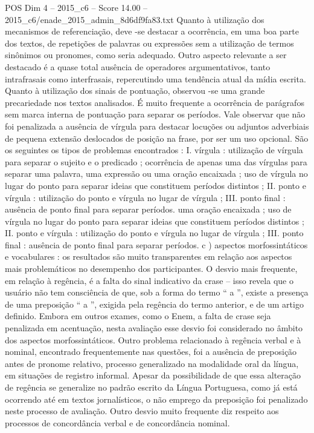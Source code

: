 \begin{textsample}{POS Dim 4 – 2015\_c6 – Score 14.00 – 2015\_c6/enade\_2015\_admin\_8d6df9fa83.txt}
Quanto à utilização dos mecanismos de referenciação, deve -se destacar a ocorrência, em uma boa parte dos textos, de repetições de palavras ou expressões sem a utilização de termos sinônimos ou pronomes, como seria adequado.
Outro aspecto relevante a ser destacado é a quase total ausência de operadores argumentativos, tanto intrafrasais como interfrasais, repercutindo uma tendência atual da mídia escrita.
Quanto à utilização dos sinais de pontuação, observou -se uma grande precariedade nos textos analisados.
É muito frequente a ocorrência de parágrafos sem marca interna de pontuação para separar os períodos.
Vale observar que não foi penalizada a ausência de vírgula para destacar locuções ou adjuntos adverbiais de pequena extensão deslocados de posição na frase, por ser um uso opcional.
São os seguintes os tipos de problemas encontrados : I. vírgula : utilização de vírgula para separar o sujeito e o predicado ; ocorrência de apenas uma das vírgulas para separar uma palavra, uma expressão ou uma oração encaixada ; uso de vírgula no lugar do ponto para separar ideias que constituem períodos distintos ; II. ponto e vírgula : utilização do ponto e vírgula no lugar de vírgula ; III. ponto final : ausência de ponto final para separar períodos. uma oração encaixada ; uso de vírgula no lugar do ponto para separar ideias que constituem períodos distintos ; II. ponto e vírgula : utilização do ponto e vírgula no lugar de vírgula ; III. ponto final : ausência de ponto final para separar períodos. c ) aspectos morfossintáticos e vocabulares : os resultados são muito transparentes em relação aos aspectos mais problemáticos no desempenho dos participantes.
O desvio mais frequente, em relação à regência, é a falta do sinal indicativo da crase – isso revela que o usuário não tem consciência de que, sob a forma do termo “ a ”, existe a presença de uma preposição “ a ”, exigida pela regência do termo anterior, e de um artigo definido.
Embora em outros exames, como o Enem, a falta de crase seja penalizada em acentuação, nesta avaliação esse desvio foi considerado no âmbito dos aspectos morfossintáticos.
Outro problema relacionado à regência verbal e à nominal, encontrado frequentemente nas questões, foi a ausência de preposição antes de pronome relativo, processo generalizado na modalidade oral da língua, em situações de registro informal.
Apesar da possibilidade de que essa alteração de regência se generalize no padrão escrito da Língua Portuguesa, como já está ocorrendo até em textos jornalísticos, o não emprego da preposição foi penalizado neste processo de avaliação.
Outro desvio muito frequente diz respeito aos processos de concordância verbal e de concordância nominal.

\end{textsample}
